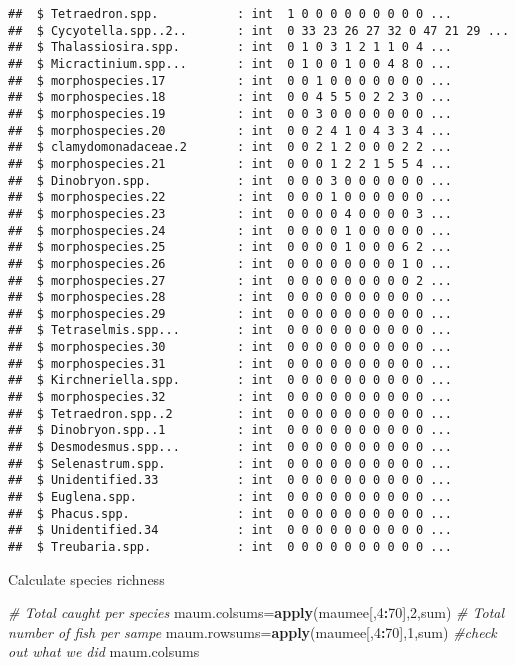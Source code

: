 \documentclass[]{article}
\newenvironment{Shaded}{\begin{snugshade}}{\end{snugshade}}
\newcommand{\KeywordTok}[1]{\textcolor[rgb]{0.13,0.29,0.53}{\textbf{#1}}}
\newcommand{\DecValTok}[1]{\textcolor[rgb]{0.00,0.00,0.81}{#1}}
\newcommand{\CommentTok}[1]{\textcolor[rgb]{0.56,0.35,0.01}{\textit{#1}}}
\newcommand{\OperatorTok}[1]{\textcolor[rgb]{0.81,0.36,0.00}{\textbf{#1}}}
\newcommand{\NormalTok}[1]{#1}
\begin{document}
\begin{verbatim}
##  $ Tetraedron.spp.           : int  1 0 0 0 0 0 0 0 0 0 ...
##  $ Cycyotella.spp..2..       : int  0 33 23 26 27 32 0 47 21 29 ...
##  $ Thalassiosira.spp.        : int  0 1 0 3 1 2 1 1 0 4 ...
##  $ Micractinium.spp...       : int  0 1 0 0 1 0 0 4 8 0 ...
##  $ morphospecies.17          : int  0 0 1 0 0 0 0 0 0 0 ...
##  $ morphospecies.18          : int  0 0 4 5 5 0 2 2 3 0 ...
##  $ morphospecies.19          : int  0 0 3 0 0 0 0 0 0 0 ...
##  $ morphospecies.20          : int  0 0 2 4 1 0 4 3 3 4 ...
##  $ clamydomonadaceae.2       : int  0 0 2 1 2 0 0 0 2 2 ...
##  $ morphospecies.21          : int  0 0 0 1 2 2 1 5 5 4 ...
##  $ Dinobryon.spp.            : int  0 0 0 3 0 0 0 0 0 0 ...
##  $ morphospecies.22          : int  0 0 0 1 0 0 0 0 0 0 ...
##  $ morphospecies.23          : int  0 0 0 0 4 0 0 0 0 3 ...
##  $ morphospecies.24          : int  0 0 0 0 1 0 0 0 0 0 ...
##  $ morphospecies.25          : int  0 0 0 0 1 0 0 0 6 2 ...
##  $ morphospecies.26          : int  0 0 0 0 0 0 0 0 1 0 ...
##  $ morphospecies.27          : int  0 0 0 0 0 0 0 0 0 2 ...
##  $ morphospecies.28          : int  0 0 0 0 0 0 0 0 0 0 ...
##  $ morphospecies.29          : int  0 0 0 0 0 0 0 0 0 0 ...
##  $ Tetraselmis.spp...        : int  0 0 0 0 0 0 0 0 0 0 ...
##  $ morphospecies.30          : int  0 0 0 0 0 0 0 0 0 0 ...
##  $ morphospecies.31          : int  0 0 0 0 0 0 0 0 0 0 ...
##  $ Kirchneriella.spp.        : int  0 0 0 0 0 0 0 0 0 0 ...
##  $ morphospecies.32          : int  0 0 0 0 0 0 0 0 0 0 ...
##  $ Tetraedron.spp..2         : int  0 0 0 0 0 0 0 0 0 0 ...
##  $ Dinobryon.spp..1          : int  0 0 0 0 0 0 0 0 0 0 ...
##  $ Desmodesmus.spp...        : int  0 0 0 0 0 0 0 0 0 0 ...
##  $ Selenastrum.spp.          : int  0 0 0 0 0 0 0 0 0 0 ...
##  $ Unidentified.33           : int  0 0 0 0 0 0 0 0 0 0 ...
##  $ Euglena.spp.              : int  0 0 0 0 0 0 0 0 0 0 ...
##  $ Phacus.spp.               : int  0 0 0 0 0 0 0 0 0 0 ...
##  $ Unidentified.34           : int  0 0 0 0 0 0 0 0 0 0 ...
##  $ Treubaria.spp.            : int  0 0 0 0 0 0 0 0 0 0 ...
\end{verbatim}

Calculate species richness

\begin{Shaded}
\begin{Highlighting}[]
\CommentTok{# Total caught per species}
\NormalTok{maum.colsums=}\KeywordTok{apply}\NormalTok{(maumee[,}\DecValTok{4}\OperatorTok{:}\DecValTok{70}\NormalTok{],}\DecValTok{2}\NormalTok{,sum)}
\CommentTok{# Total number of fish per sampe}
\NormalTok{maum.rowsums=}\KeywordTok{apply}\NormalTok{(maumee[,}\DecValTok{4}\OperatorTok{:}\DecValTok{70}\NormalTok{],}\DecValTok{1}\NormalTok{,sum)}
\CommentTok{#check out what we did}
\NormalTok{maum.colsums}
\end{Highlighting}
\end{Shaded}
\end{document}
